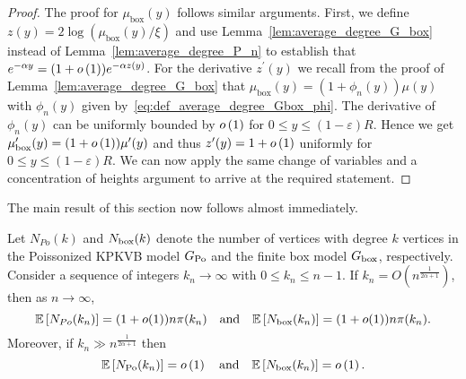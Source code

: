 \begin{proof}
The proof for $\mu_{\mathrm{box}}(y)$ follows similar arguments. First, we define $z(y) = 2 \log (\mu_{\mathrm{box}}(y)/\xi)$ and use Lemma~\ref{lem:average_degree_G_box} instead of Lemma~\ref{lem:average_degree_P_n} to establish that $e^{-\alpha y} = (1+o\left(1\right))e^{-\alpha z(y)}$. For the derivative $z^\prime(y)$ we recall from the proof of Lemma~\ref{lem:average_degree_G_box} that $\mu_{\mathrm{box}}(y) = (1 + \phi_n(y)) \mu(y)$ with $\phi_n(y)$ given by~\eqref{eq:def_average_degree_Gbox_phi}. The derivative of $\phi_n(y)$ can be uniformly bounded by $o\left(1\right)$ for $0 \le y \le (1-\varepsilon)R$. Hence we get $\mu_{\mathrm{box}}^\prime(y) = (1+o\left(1\right)) \mu^\prime(y)$ and thus $z^\prime(y) = 1 + o\left(1\right)$ uniformly for $0 \le y \le (1-\varepsilon)R$. We can now apply the same change of variables and a concentration of heights argument to arrive at the required statement.

\end{proof}

The main result of this section now follows almost immediately.

\begin{lemma}\label{lem:expnnkn}
Let $N_{Po}(k)$ and $N_{\text{box}}(k)$ denote the number of vertices with degree $k$ vertices in the Poissonized KPKVB model $G_{{\mathrm{Po}}}$ and the finite box model $G_{\mathrm{box}}$, respectively. Consider a sequence of integers $k_n\rightarrow\infty$ with $0 \leq k_n \leq n-1$.	If $k_n = O\left(n^{\frac{1}{2\alpha+1}}\right)$, then as $n \to \infty$,
\[
	\mathbb{E}\left[N_{Po}(k_n)\right] =(1+o(1)) n {\pi}(k_n) \quad \text{and} \quad \mathbb{E}\left[N_{\text{box}}(k_n)\right] =(1+o(1)) n {\pi}(k_n).
\]
Moreover, if $k_n \gg n^{\frac{1}{2\alpha + 1}}$ then
\[
	\mathbb{E}\left[N_{{\mathrm{Po}}}(k_n)\right] = o\left(1\right) \quad \text{and} \quad \mathbb{E}\left[N_{\text{box}}(k_n)\right] = o\left(1\right).
\]
\end{lemma}

